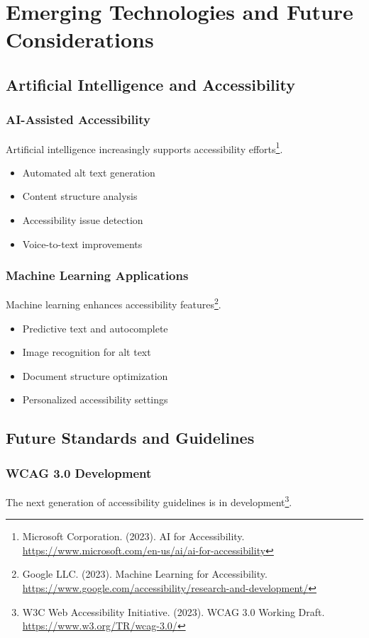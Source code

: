 \section{Emerging Technologies and Future Considerations}

\subsection{Artificial Intelligence and Accessibility}

\subsubsection{AI-Assisted Accessibility}
Artificial intelligence increasingly supports accessibility efforts\footnote{Microsoft Corporation. (2023). AI for Accessibility. \url{https://www.microsoft.com/en-us/ai/ai-for-accessibility}}.

\begin{itemize}
\item Automated alt text generation
\item Content structure analysis
\item Accessibility issue detection
\item Voice-to-text improvements
\end{itemize}

\subsubsection{Machine Learning Applications}
Machine learning enhances accessibility features\footnote{Google LLC. (2023). Machine Learning for Accessibility. \url{https://www.google.com/accessibility/research-and-development/}}.

\begin{itemize}
\item Predictive text and autocomplete
\item Image recognition for alt text
\item Document structure optimization
\item Personalized accessibility settings
\end{itemize}

\subsection{Future Standards and Guidelines}

\subsubsection{WCAG 3.0 Development}
The next generation of accessibility guidelines is in development\footnote{W3C Web Accessibility Initiative. (2023). WCAG 3.0 Working Draft. \url{https://www.w3.org/TR/wcag-3.0/}}.

